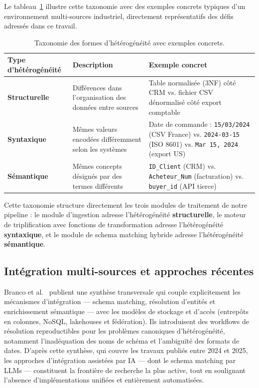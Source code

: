 Le tableau~\ref{tab:heterogeneite} illustre cette taxonomie
avec des exemples concrets typiques d'un environnement
multi-sources industriel, directement représentatifs
des défis adressés dans ce travail.

\begin{table}[H]
\centering
\caption{Taxonomie des formes d'hétérogénéité
         avec exemples concrets.}
\label{tab:heterogeneite}
\renewcommand{\arraystretch}{1.4}
\begin{tabular}{|p{3.2cm}|p{5cm}|p{5cm}|}
\hline
\textbf{Type d'hétérogénéité}
    & \textbf{Description}
    & \textbf{Exemple concret} \\
\hline
\textbf{Structurelle}
    & Différences dans l'organisation
      des données entre sources
    & Table normalisée (3NF) côté CRM
      vs. fichier CSV dénormalisé
      côté export comptable \\
\hline
\textbf{Syntaxique}
    & Mêmes valeurs encodées
      différemment selon les systèmes
    & Date de commande :
      \texttt{15/03/2024} (CSV France)
      vs. \texttt{2024-03-15} (ISO 8601)
      vs. \texttt{Mar 15, 2024} (export US) \\
\hline
\textbf{Sémantique}
    & Mêmes concepts désignés
      par des termes différents
    & \texttt{ID\_Client} (CRM)
      vs. \texttt{Acheteur\_Num} (facturation)
      vs. \texttt{buyer\_id} (API tierce) \\
\hline
\end{tabular}
\end{table}

Cette taxonomie structure directement les trois modules
de traitement de notre pipeline :
le module d'ingestion adresse l'hétérogénéité \textbf{structurelle},
le moteur de triplification avec fonctions de transformation
adresse l'hétérogénéité \textbf{syntaxique}, et le module
de schema matching hybride adresse l'hétérogénéité \textbf{sémantique}.

\subsection{Intégration multi-sources et approches récentes}
Branco et al.~\cite{branco2025integration} publient une synthèse transversale qui couple explicitement les mécanismes d'intégration — schema matching, résolution d'entités et enrichissement sémantique — avec les modèles de stockage et d'accès (entrepôts en colonnes, NoSQL, lakehouses et fédération). Ils introduisent des workflows de résolution reproductibles pour les problèmes canoniques d'hétérogénéité, notamment l'inadéquation des noms de schéma et l'ambiguïté des formats de dates. D'après cette synthèse, qui couvre les travaux publiés entre 2024 et 2025, les approches d'intégration assistées par IA — dont le schema matching par LLMs — constituent la frontière de recherche la plus active, tout en soulignant l'absence d'implémentations unifiées et entièrement automatisées.

